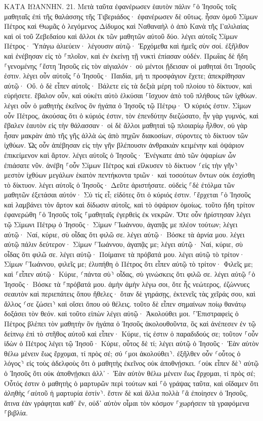 \documentclass[twoside, 9pt]{extreport}
\begin{document}
ΚΑΤΑ ΙΩΑΝΝΗΝ.
21.
Μετὰ ταῦτα ἐφανέρωσεν ἑαυτὸν πάλιν ⸀ὁ Ἰησοῦς τοῖς μαθηταῖς ἐπὶ τῆς θαλάσσης τῆς Τιβεριάδος· ἐφανέρωσεν δὲ οὕτως. 
ἦσαν ὁμοῦ Σίμων Πέτρος καὶ Θωμᾶς ὁ λεγόμενος Δίδυμος καὶ Ναθαναὴλ ὁ ἀπὸ Κανὰ τῆς Γαλιλαίας καὶ οἱ τοῦ Ζεβεδαίου καὶ ἄλλοι ἐκ τῶν μαθητῶν αὐτοῦ δύο. 
λέγει αὐτοῖς Σίμων Πέτρος· Ὑπάγω ἁλιεύειν· λέγουσιν αὐτῷ· Ἐρχόμεθα καὶ ἡμεῖς σὺν σοί. ἐξῆλθον καὶ ἐνέβησαν εἰς τὸ ⸀πλοῖον, καὶ ἐν ἐκείνῃ τῇ νυκτὶ ἐπίασαν οὐδέν. 
Πρωΐας δὲ ἤδη ⸀γενομένης ⸀ἔστη Ἰησοῦς εἰς τὸν αἰγιαλόν· οὐ μέντοι ᾔδεισαν οἱ μαθηταὶ ὅτι Ἰησοῦς ἐστιν. 
λέγει οὖν αὐτοῖς ⸀ὁ Ἰησοῦς· Παιδία, μή τι προσφάγιον ἔχετε; ἀπεκρίθησαν αὐτῷ· Οὔ. 
ὁ δὲ εἶπεν αὐτοῖς· Βάλετε εἰς τὰ δεξιὰ μέρη τοῦ πλοίου τὸ δίκτυον, καὶ εὑρήσετε. ἔβαλον οὖν, καὶ οὐκέτι αὐτὸ ἑλκύσαι ⸀ἴσχυον ἀπὸ τοῦ πλήθους τῶν ἰχθύων. 
λέγει οὖν ὁ μαθητὴς ἐκεῖνος ὃν ἠγάπα ὁ Ἰησοῦς τῷ Πέτρῳ· Ὁ κύριός ἐστιν. Σίμων οὖν Πέτρος, ἀκούσας ὅτι ὁ κύριός ἐστιν, τὸν ἐπενδύτην διεζώσατο, ἦν γὰρ γυμνός, καὶ ἔβαλεν ἑαυτὸν εἰς τὴν θάλασσαν· 
οἱ δὲ ἄλλοι μαθηταὶ τῷ πλοιαρίῳ ἦλθον, οὐ γὰρ ἦσαν μακρὰν ἀπὸ τῆς γῆς ἀλλὰ ὡς ἀπὸ πηχῶν διακοσίων, σύροντες τὸ δίκτυον τῶν ἰχθύων. 
Ὡς οὖν ἀπέβησαν εἰς τὴν γῆν βλέπουσιν ἀνθρακιὰν κειμένην καὶ ὀψάριον ἐπικείμενον καὶ ἄρτον. 
λέγει αὐτοῖς ὁ Ἰησοῦς· Ἐνέγκατε ἀπὸ τῶν ὀψαρίων ὧν ἐπιάσατε νῦν. 
ἀνέβη ⸀οὖν Σίμων Πέτρος καὶ εἵλκυσεν τὸ δίκτυον ⸂εἰς τὴν γῆν⸃ μεστὸν ἰχθύων μεγάλων ἑκατὸν πεντήκοντα τριῶν· καὶ τοσούτων ὄντων οὐκ ἐσχίσθη τὸ δίκτυον. 
λέγει αὐτοῖς ὁ Ἰησοῦς· Δεῦτε ἀριστήσατε. οὐδεὶς ⸀δὲ ἐτόλμα τῶν μαθητῶν ἐξετάσαι αὐτόν· Σὺ τίς εἶ; εἰδότες ὅτι ὁ κύριός ἐστιν. 
⸀ἔρχεται ⸀ὁ Ἰησοῦς καὶ λαμβάνει τὸν ἄρτον καὶ δίδωσιν αὐτοῖς, καὶ τὸ ὀψάριον ὁμοίως. 
τοῦτο ἤδη τρίτον ἐφανερώθη ⸀ὁ Ἰησοῦς τοῖς ⸀μαθηταῖς ἐγερθεὶς ἐκ νεκρῶν. 
Ὅτε οὖν ἠρίστησαν λέγει τῷ Σίμωνι Πέτρῳ ὁ Ἰησοῦς· Σίμων ⸀Ἰωάννου, ἀγαπᾷς με πλέον τούτων; λέγει αὐτῷ· Ναί, κύριε, σὺ οἶδας ὅτι φιλῶ σε. λέγει αὐτῷ· Βόσκε τὰ ἀρνία μου. 
λέγει αὐτῷ πάλιν δεύτερον· Σίμων ⸀Ἰωάννου, ἀγαπᾷς με; λέγει αὐτῷ· Ναί, κύριε, σὺ οἶδας ὅτι φιλῶ σε. λέγει αὐτῷ· Ποίμαινε τὰ πρόβατά μου. 
λέγει αὐτῷ τὸ τρίτον· Σίμων ⸀Ἰωάννου, φιλεῖς με; ἐλυπήθη ὁ Πέτρος ὅτι εἶπεν αὐτῷ τὸ τρίτον· Φιλεῖς με; καὶ ⸀εἶπεν αὐτῷ· Κύριε, ⸂πάντα σὺ⸃ οἶδας, σὺ γινώσκεις ὅτι φιλῶ σε. λέγει αὐτῷ ⸀ὁ Ἰησοῦς· Βόσκε τὰ ⸀πρόβατά μου. 
ἀμὴν ἀμὴν λέγω σοι, ὅτε ἦς νεώτερος, ἐζώννυες σεαυτὸν καὶ περιεπάτεις ὅπου ἤθελες· ὅταν δὲ γηράσῃς, ἐκτενεῖς τὰς χεῖράς σου, καὶ ἄλλος ⸂σε ζώσει⸃ καὶ οἴσει ὅπου οὐ θέλεις. 
τοῦτο δὲ εἶπεν σημαίνων ποίῳ θανάτῳ δοξάσει τὸν θεόν. καὶ τοῦτο εἰπὼν λέγει αὐτῷ· Ἀκολούθει μοι. 
⸀Ἐπιστραφεὶς ὁ Πέτρος βλέπει τὸν μαθητὴν ὃν ἠγάπα ὁ Ἰησοῦς ἀκολουθοῦντα, ὃς καὶ ἀνέπεσεν ἐν τῷ δείπνῳ ἐπὶ τὸ στῆθος αὐτοῦ καὶ εἶπεν· Κύριε, τίς ἐστιν ὁ παραδιδούς σε; 
τοῦτον ⸀οὖν ἰδὼν ὁ Πέτρος λέγει τῷ Ἰησοῦ· Κύριε, οὗτος δὲ τί; 
λέγει αὐτῷ ὁ Ἰησοῦς· Ἐὰν αὐτὸν θέλω μένειν ἕως ἔρχομαι, τί πρὸς σέ; σύ ⸂μοι ἀκολούθει⸃. 
ἐξῆλθεν οὖν ⸂οὗτος ὁ λόγος⸃ εἰς τοὺς ἀδελφοὺς ὅτι ὁ μαθητὴς ἐκεῖνος οὐκ ἀποθνῄσκει. ⸂οὐκ εἶπεν δὲ⸃ αὐτῷ ὁ Ἰησοῦς ὅτι οὐκ ἀποθνῄσκει ἀλλ᾽· Ἐὰν αὐτὸν θέλω μένειν ἕως ἔρχομαι, τί πρὸς σέ; 
Οὗτός ἐστιν ὁ μαθητὴς ὁ μαρτυρῶν περὶ τούτων καὶ ⸀ὁ γράψας ταῦτα, καὶ οἴδαμεν ὅτι ἀληθὴς ⸂αὐτοῦ ἡ μαρτυρία ἐστίν⸃. 
ἔστιν δὲ καὶ ἄλλα πολλὰ ⸀ἃ ἐποίησεν ὁ Ἰησοῦς, ἅτινα ἐὰν γράφηται καθ᾽ ἕν, οὐδ᾽ αὐτὸν οἶμαι τὸν κόσμον ⸀χωρήσειν τὰ γραφόμενα ⸀βιβλία. 
\end{document}
